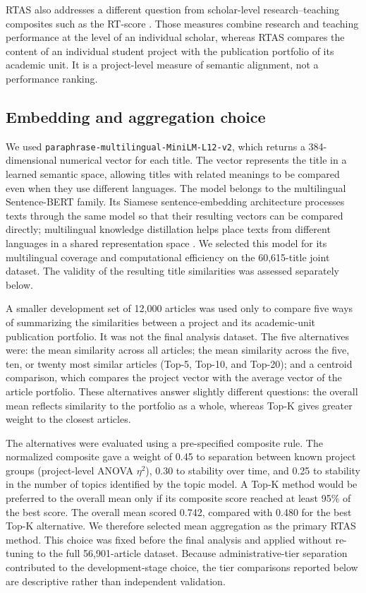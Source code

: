 \documentclass[pdflatex,sn-apa]{sn-jnl}
\begin{document}
RTAS also addresses a different question from scholar-level research--teaching composites such as the RT-score \citep{scafetta2025rt}. Those measures combine research and teaching performance at the level of an individual scholar, whereas RTAS compares the content of an individual student project with the publication portfolio of its academic unit. It is a project-level measure of semantic alignment, not a performance ranking.

\subsection{Embedding and aggregation choice}

We used \texttt{paraphrase-multilingual-MiniLM-L12-v2}, which returns a 384-dimensional numerical vector for each title. The vector represents the title in a learned semantic space, allowing titles with related meanings to be compared even when they use different languages. The model belongs to the multilingual Sentence-BERT family. Its Siamese sentence-embedding architecture processes texts through the same model so that their resulting vectors can be compared directly; multilingual knowledge distillation helps place texts from different languages in a shared representation space \citep{reimers2019sbert,reimers2020multilingual}. We selected this model for its multilingual coverage and computational efficiency on the 60,615-title joint dataset. The validity of the resulting title similarities was assessed separately below.

A smaller development set of 12,000 articles was used only to compare five ways of summarizing the similarities between a project and its academic-unit publication portfolio. It was not the final analysis dataset. The five alternatives were: the mean similarity across all articles; the mean similarity across the five, ten, or twenty most similar articles (Top-5, Top-10, and Top-20); and a centroid comparison, which compares the project vector with the average vector of the article portfolio. These alternatives answer slightly different questions: the overall mean reflects similarity to the portfolio as a whole, whereas Top-K gives greater weight to the closest articles.

The alternatives were evaluated using a pre-specified composite rule. The normalized composite gave a weight of 0.45 to separation between known project groups (project-level ANOVA $\eta^2$), 0.30 to stability over time, and 0.25 to stability in the number of topics identified by the topic model. A Top-K method would be preferred to the overall mean only if its composite score reached at least 95\% of the best score. The overall mean scored 0.742, compared with 0.480 for the best Top-K alternative. We therefore selected mean aggregation as the primary RTAS method. This choice was fixed before the final analysis and applied without re-tuning to the full 56,901-article dataset. Because administrative-tier separation contributed to the development-stage choice, the tier comparisons reported below are descriptive rather than independent validation.
\end{document}
